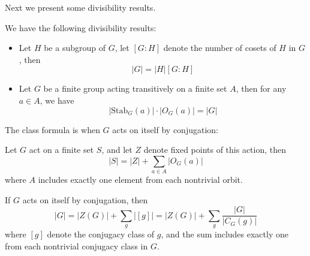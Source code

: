 
Next we present some divisibility results.
\begin{prop}
    We have the following divisibility results:
    \begin{itemize} 
        \item Let $H$ be a subgroup of $G$, let $[G:H]$ denote the number of cosets of $H$ in $G$, then 
        \begin{equation*}
            |G|=|H|[G:H]
        \end{equation*}
        \item Let $G$ be a finite group acting transitively on a finite set $A$, then for any $a\in A$, we have 
        \begin{equation*}
            |\text{Stab}_G(a)|\cdot|O_G(a)|=|G|
        \end{equation*}
    \end{itemize} 
\end{prop}
The class formula is when $G$ acts on itself by conjugation:
\begin{prop}
    Let $G$ act on a finite set $S$, and let $Z$ denote fixed points of this action, then 
    \begin{equation*}
        |S|=|Z|+\sum_{a\in A}|O_G(a)|
    \end{equation*}
    where $A$ includes exactly one element from each nontrivial orbit.

    If $G$ acts on itself by conjugation, then 
    \begin{equation*}
        |G|=|Z(G)|+\sum_{g}|[g]|=|Z(G)|+\sum_{g}\frac{|G|}{|C_G(g)|}
    \end{equation*}
    where $[g]$ denote the conjugacy class of $g$, and the sum includes exactly one from each nontrivial conjugacy class in $G$.
\end{prop}


